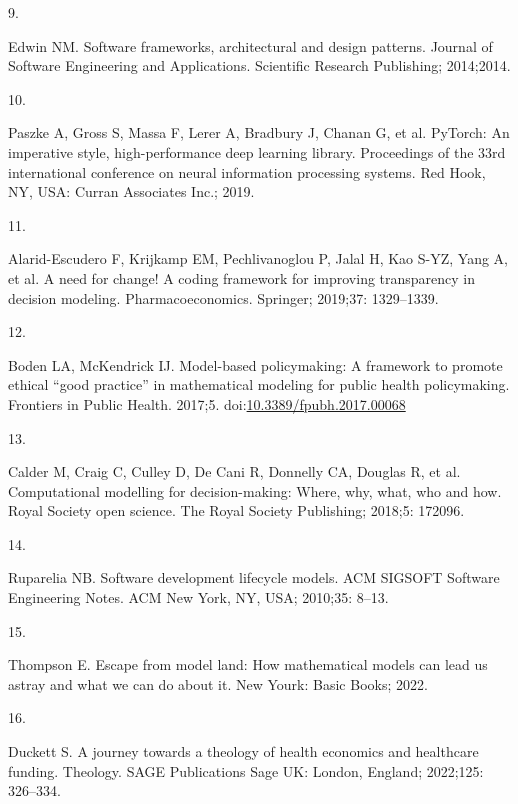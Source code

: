 \documentclass[
]{article}
\newlength{\cslhangindent}
\newlength{\csllabelwidth}
\newlength{\cslentryspacingunit} %
\newenvironment{CSLReferences}[2] %
 {%
  \setlength{\parindent}{0pt}
  \ifodd #1
  \let\oldpar\par
  \def\par{\hangindent=\cslhangindent\oldpar}
  \fi
  \setlength{\parskip}{#2\cslentryspacingunit}
 }%
 {}
\newcommand{\CSLLeftMargin}[1]{\parbox[t]{\csllabelwidth}{#1}}
\newcommand{\CSLRightInline}[1]{\parbox[t]{\linewidth - \csllabelwidth}{#1}\break}
\begin{document}
\begin{CSLReferences}{0}{0}
\leavevmode{}%
\CSLLeftMargin{9. }%
\CSLRightInline{Edwin NM. Software frameworks, architectural and design patterns. Journal of Software Engineering and Applications. Scientific Research Publishing; 2014;2014. }

\leavevmode{}%
\CSLLeftMargin{10. }%
\CSLRightInline{Paszke A, Gross S, Massa F, Lerer A, Bradbury J, Chanan G, et al. PyTorch: An imperative style, high-performance deep learning library. Proceedings of the 33rd international conference on neural information processing systems. Red Hook, NY, USA: Curran Associates Inc.; 2019. }

\leavevmode{}%
\CSLLeftMargin{11. }%
\CSLRightInline{Alarid-Escudero F, Krijkamp EM, Pechlivanoglou P, Jalal H, Kao S-YZ, Yang A, et al. A need for change! A coding framework for improving transparency in decision modeling. Pharmacoeconomics. Springer; 2019;37: 1329--1339. }

\leavevmode{}%
\CSLLeftMargin{12. }%
\CSLRightInline{Boden LA, McKendrick IJ. Model-based policymaking: A framework to promote ethical {``good practice''} in mathematical modeling for public health policymaking. Frontiers in Public Health. 2017;5. doi:\href{https://doi.org/10.3389/fpubh.2017.00068}{10.3389/fpubh.2017.00068}}

\leavevmode{}%
\CSLLeftMargin{13. }%
\CSLRightInline{Calder M, Craig C, Culley D, De Cani R, Donnelly CA, Douglas R, et al. Computational modelling for decision-making: Where, why, what, who and how. Royal Society open science. The Royal Society Publishing; 2018;5: 172096. }

\leavevmode{}%
\CSLLeftMargin{14. }%
\CSLRightInline{Ruparelia NB. Software development lifecycle models. ACM SIGSOFT Software Engineering Notes. ACM New York, NY, USA; 2010;35: 8--13. }

\leavevmode{}%
\CSLLeftMargin{15. }%
\CSLRightInline{Thompson E. Escape from model land: How mathematical models can lead us astray and what we can do about it. New Yourk: Basic Books; 2022. }

\leavevmode{}%
\CSLLeftMargin{16. }%
\CSLRightInline{Duckett S. A journey towards a theology of health economics and healthcare funding. Theology. SAGE Publications Sage UK: London, England; 2022;125: 326--334. }


\end{CSLReferences}
\end{document}
